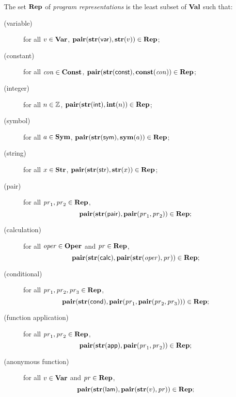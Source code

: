 The set $\mathbf{Rep}$ of \emph{program representations} is the least subset of
$\mathbf{Val}$ such that:
\begin{description}
\item[\quad(variable)] for all $v\in\mathbf{Var}$,
  $\mathbf{pair}(\mathbf{str}(\mathsf{var}), \mathbf{str}(v)) \in \mathbf{Rep}$;

\item[\quad(constant)] for all $\mathit{con}\in\mathbf{Const}$,
  $\mathbf{pair}(\mathbf{str}(\mathsf{const}), \mathbf{const}(\mathit{con}))\in\mathbf{Rep}$;

\item[\quad(integer)] for all $n\in\mathbb{Z}$, 
  $\mathbf{pair}(\mathbf{str}(\mathsf{int}), \mathbf{int}(n))\in\mathbf{Rep}$;

\item[\quad(symbol)] for all $a\in\mathbf{Sym}$,
  $\mathbf{pair}(\mathbf{str}(\mathsf{sym}), \mathbf{sym}(a))\in\mathbf{Rep}$;

\item[\quad(string)] for all $x\in\mathbf{Str}$,
  $\mathbf{pair}(\mathbf{str}(\mathsf{str}),\mathbf{str}(x))\in\mathbf{Rep}$;

\item[\quad(pair)] for all $\mathit{pr}_1,\mathit{pr}_2\in\mathbf{Rep}$,
  \begin{displaymath}
    \mathbf{pair}(\mathbf{str}(\mathsf{pair}),
    \mathbf{pair}(\mathit{pr}_1, \mathit{pr}_2)) \in \mathbf{Rep} ;
  \end{displaymath}

\item[\quad(calculation)] for all $\mathit{oper}\in\mathbf{Oper}$ and
  $\mathit{pr}\in\mathbf{Rep}$,
  \begin{displaymath}
    \mathbf{pair}(\mathbf{str}(\mathsf{calc}),
    \mathbf{pair}(\mathbf{str}(\mathit{oper}), \mathit{pr})) \in \mathbf{Rep} ;
  \end{displaymath}

\item[\quad(conditional)] for all $\mathit{pr}_1,\mathit{pr}_2,\mathit{pr}_3\in\mathbf{Rep}$,
  \begin{displaymath}
    \mathbf{pair}(\mathbf{str}(\mathsf{cond}),
    \mathbf{pair}(\mathit{pr}_1, \mathbf{pair}(\mathit{pr}_2, \mathit{pr}_3))) \in \mathbf{Rep} ;
  \end{displaymath}

\item[\quad(function application)] for all $\mathit{pr}_1,\mathit{pr}_2\in\mathbf{Rep}$,
  \begin{displaymath}
    \mathbf{pair}(\mathbf{str}(\mathsf{app}),
    \mathbf{pair}(\mathit{pr}_1, \mathit{pr}_2)) \in \mathbf{Rep} ;
  \end{displaymath}

\item[\quad(anonymous function)] for all $v\in\mathbf{Var}$ and
  $\mathit{pr}\in\mathbf{Rep}$,
  \begin{displaymath}
    \mathbf{pair}(\mathbf{str}(\mathsf{lam}),
    \mathbf{pair}(\mathbf{str}(v), \mathit{pr})) \in \mathbf{Rep} ;
  \end{displaymath}


\end{description}

